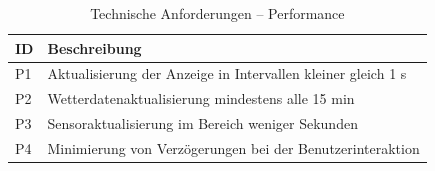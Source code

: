 \begin{table}[H]
\caption{Technische Anforderungen – Performance}
\centering
\begin{tabular}{p{0.5cm} p{10.5cm}}
\textbf{ID} & \textbf{Beschreibung} \\
\hline
P1 & Aktualisierung der Anzeige in Intervallen kleiner gleich 1 s \\
P2 & Wetterdatenaktualisierung mindestens alle 15 min \\
P3 & Sensoraktualisierung im Bereich weniger Sekunden \\
P4 & Minimierung von Verzögerungen bei der Benutzerinteraktion \\
\end{tabular}
\label{tab:Performance Anforderung}
\end{table}